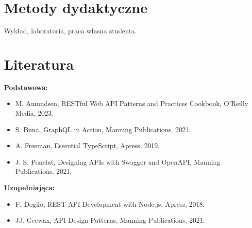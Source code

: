 \documentclass[12pt, a4paper]{article}
\begin{document}
\section{Metody dydaktyczne}

Wykład, laboratoria, praca własna studenta.

\section{Literatura}

\textbf{Podstawowa:}
\begin{itemize}
  \item M. Amundsen, RESTful Web API Patterns and Practices Cookbook, O’Reilly Media, 2023.
  \item S. Buna, GraphQL in Action, Manning Publications, 2021.
  \item A. Freeman, Essential TypeScript, Apress, 2019.
  \item J. S. Ponelat, Designing APIs with Swagger and OpenAPI, Manning Publications, 2021.
\end{itemize}

\textbf{Uzupełniająca:}
\begin{itemize}
  \item F, Dogilo, REST API Development with Node.js, Apress, 2018.
  \item JJ. Geewax, API Design Patterns, Manning Publications, 2021.
\end{itemize}
\end{document}
